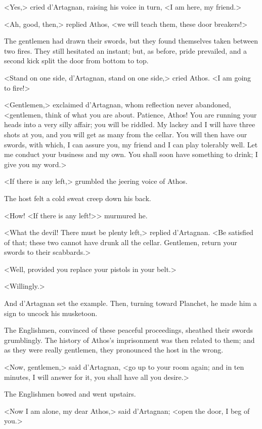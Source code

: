 <Yes,> cried d'Artagnan, raising his voice in turn, <I am here, my friend.> 

<Ah, good, then,> replied Athos, <we will teach them, these door breakers!> 

The gentlemen had drawn their swords, but they found themselves taken between two fires. They still hesitated an instant; but, as before, pride prevailed, and a second kick split the door from bottom to top. 

<Stand on one side, d'Artagnan, stand on one side,> cried Athos. <I am going to fire!> 

<Gentlemen,> exclaimed d'Artagnan, whom reflection never abandoned, <gentlemen, think of what you are about. Patience, Athos! You are running your heads into a very silly affair; you will be riddled. My lackey and I will have three shots at you, and you will get as many from the cellar. You will then have our swords, with which, I can assure you, my friend and I can play tolerably well. Let me conduct your business and my own. You shall soon have something to drink; I give you my word.> 

<If there is any left,> grumbled the jeering voice of Athos. 

The host felt a cold sweat creep down his back. 

<How! <If there is any left!>> murmured he. 

<What the devil! There must be plenty left,> replied d'Artagnan. <Be satisfied of that; these two cannot have drunk all the cellar. Gentlemen, return your swords to their scabbards.> 

<Well, provided you replace your pistols in your belt.> 

<Willingly.> 

And d'Artagnan set the example. Then, turning toward Planchet, he made him a sign to uncock his musketoon. 

The Englishmen, convinced of these peaceful proceedings, sheathed their swords grumblingly. The history of Athos's imprisonment was then related to them; and as they were really gentlemen, they pronounced the host in the wrong. 

<Now, gentlemen,> said d'Artagnan, <go up to your room again; and in ten minutes, I will answer for it, you shall have all you desire.> 

The Englishmen bowed and went upstairs. 

<Now I am alone, my dear Athos,> said d'Artagnan; <open the door, I beg of you.> 

